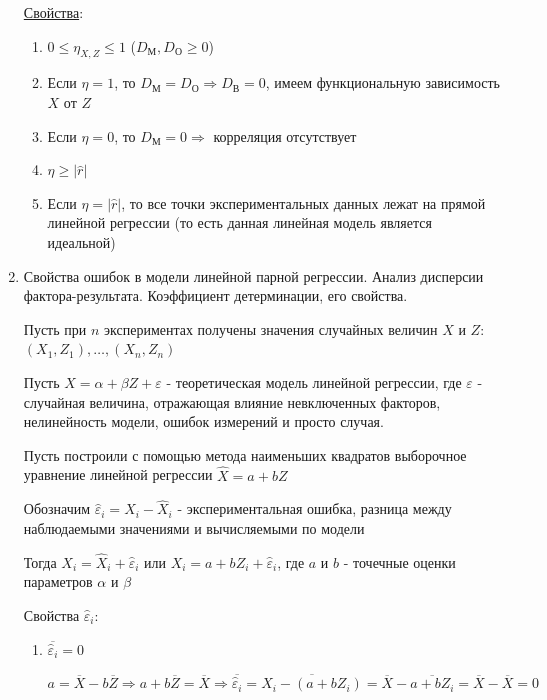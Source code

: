 \documentclass[12pt]{article}
\begin{document}
\begin{enumerate}
    \underline{Свойства}:

    \begin{enumerate}
        \item $0 \leq \eta_{X, Z} \leq 1$ ($D_\text{М}, D_\text{О} \geq 0$)

        \item Если $\eta = 1$, то $D_\text{М} = D_\text{О} \Longrightarrow D_\text{В} = 0$, имеем функциональную зависимость $X$ от $Z$

        \item Если $\eta = 0$, то $D_\text{М} = 0 \Longrightarrow$ корреляция отсутствует

        \item $\eta \geq |\hat r|$

        \item Если $\eta = |\hat r|$, то все точки экспериментальных данных лежат на прямой линейной регрессии 
        (то есть данная линейная модель является идеальной)

    \end{enumerate}

    \item Свойства ошибок в модели линейной парной регрессии. Анализ дисперсии фактора-результата. Коэффициент детерминации, его свойства.

    Пусть при $n$ экспериментах получены значения случайных величин $X$ и $Z$: $(X_1, Z_1), \dots, (X_n, Z_n)$

    Пусть $X = \alpha + \beta Z + \varepsilon$ - теоретическая модель линейной регрессии, где $\varepsilon$ - случайная величина,
    отражающая влияние невключенных факторов, нелинейность модели, ошибок измерений и просто случая.

    Пусть построили с помощью метода наименьших квадратов выборочное уравнение линейной регрессии $\hat X = a + b Z$

    Обозначим $\hat \varepsilon_i = X_i - \hat X_i$ - экспериментальная ошибка, разница между наблюдаемыми значениями и 
    вычисляемыми по модели

    Тогда $X_i = \hat X_i + \hat \varepsilon_i$ или $X_i = a + b Z_i + \hat \varepsilon_i$, где $a$ и $b$ - точечные оценки параметров $\alpha$ и $\beta$

    Свойства $\hat \varepsilon_i$:

    \begin{enumerate}
        \item $\overline{\hat \varepsilon_i} = 0$

        \begin{MyProof}
            $a = \overline{X} - b \overline{Z} \Longrightarrow a + b \overline{Z} = \overline{X} \Longrightarrow \overline{\hat \varepsilon_i} = \overline{X_i - (a + b Z_i)} = \overline{X} - \overline{a + b Z_i} = \overline{X} - \overline{X} = 0$
        \end{MyProof}


\end{enumerate}
\end{enumerate}
\end{document}
